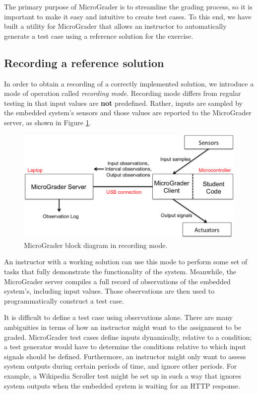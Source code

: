 \documentclass[12pt]{article}
\begin{document}
The primary purpose of MicroGrader is to streamline the grading process, so it is important to make it easy and intuitive to create test cases.  To this end, we have built a utility for MicroGrader that allows an instructor to automatically generate a test case using a reference solution for the exercise.

\subsection{Recording a reference solution}
In order to obtain a recording of a correctly implemented solution, we introduce a mode of operation called \textit{recording mode}.  Recording mode differs from regular testing in that input values are \textbf{not} predefined.  Rather, inputs are sampled by the embedded system's sensors and those values are reported to the MicroGrader server, as shown in Figure \ref{fig:recording-mode}.

\begin{figure}[ht]
\centering
\includegraphics[width=\linewidth]{recording-mode.png}
\caption{MicroGrader block diagram in recording mode.}
\label{fig:recording-mode}
\end{figure}

An instructor with a working solution can use this mode to perform some set of tasks that fully demonstrate the functionality of the system.  Meanwhile, the MicroGrader server compiles a full record of observations of the embedded system's, including input values.  Those observations are then used to programmatically construct a test case.

It is difficult to define a test case using observations alone.  There are many ambiguities in terms of how an instructor might want to the assignment to be graded.  MicroGrader test cases define inputs dynamically, relative to a condition; a test generator would have to determine the conditions relative to which input signals should be defined.  Furthermore, an instructor might only want to assess system outputs during certain periods of time, and ignore other periods.  For example, a Wikipedia Scroller test might be set up in such a way that ignores system outputs when the embedded system is waiting for an HTTP response.
\end{document}
